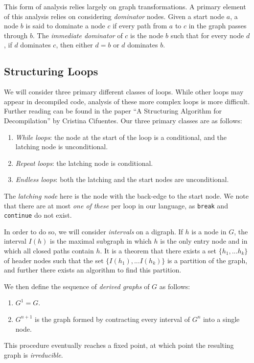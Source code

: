 \documentclass{article}
\begin{document}
This form of analysis relies largely on graph transformations. A primary element of this analysis
relies on considering {\em dominator} nodes. Given a start node $a$, a node $b$ is said to 
dominate a node $c$ if every path from $a$ to $c$ in the graph passes through $b$. The 
{\em immediate dominator} of $c$ is the node $b$ such that for every node $d$, if $d$ dominates
$c$, then either $d = b$ or $d$ dominates $b$.

\subsection{Structuring Loops}
We will consider three primary different classes of loops. While other loops may appear
in decompiled code, analysis of these more complex loops is more difficult. Further reading can
be found in the paper ``A Structuring Algorithm for Decompilation'' by Cristina Cifuentes.
Our three primary classes are as follows:
\begin{enumerate}
\item {\em While loops}: the node at the start of the loop is a conditional,
	and the latching node is unconditional.
\item {\em Repeat loops}: the latching node is conditional.
\item {\em Endless loops}: both the latching and the start nodes are unconditional.
\end{enumerate}
The {\em latching node} here is the node with the back-edge to the start node.
We note that there are at most {\em one of these} per loop in our language, as \verb+break+
and \verb+continue+ do not exist.

In order to do so, we will consider {\em intervals} on a digraph. If $h$ is a node in $G$,
the interval $I(h)$ is the maximal subgraph in which $h$ is the only entry node and 
in which all closed paths contain $h$. It is a theorem that there exists a set 
$\{h_1, ... h_k\}$ of header nodes such that the set $\{ I(h_1), ... I(h_k) \}$ is
a partition of the graph, and further there exists an algorithm to find this partition.

We then define the sequence of {\em derived graphs} of $G$ as follows:
\begin{enumerate}
\item $G^1 = G$.
\item $G^{n+1}$ is the graph formed by contracting every interval of $G^n$ into a single node.
\end{enumerate}
This procedure eventually reaches a fixed point, at which point the resulting graph is
{\em irreducible}.
\end{document}
